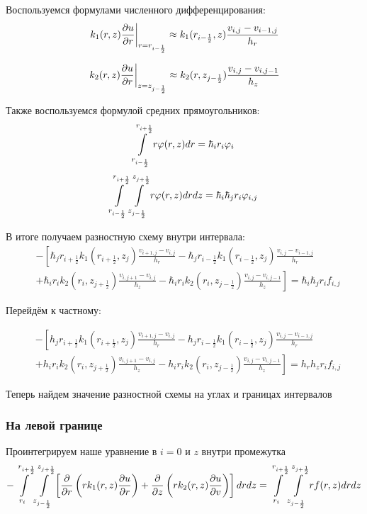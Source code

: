 Воспользуемся формулами численного дифференцирования:
\[
  \left . k_1(r, z) \pdv{u}{r} \right \vert_{r = r_{i - \frac{1}{2}}}
  \approx k_1(r_{i - \frac{1}{2}}, z) 
  \frac{v_{i, j} - v_{i - 1, j}}{h_r}
\]

\[
  \left . k_2(r, z) \pdv{u}{r} \right \vert_{z = z_{j - \frac{1}{2}}}
  \approx k_2(r, z_{j - \frac{1}{2}}) 
  \frac{v_{i, j} - v_{i, j - 1}}{h_z}
\]

Также воспользуемся формулой средних прямоугольников:
\[
  \int\limits^{r_{i+\frac{1}{2}}}_{r_{i-\frac{1}{2}}} r \varphi(r, z) dr
  = \hbar_i r_i \varphi_i
\]
\[
  \int\limits^{r_{i +\frac{1}{2}}}_{r_{i -\frac{1}{2}}} \int\limits^{z_{j +\frac{1}{2}}}_{z_{j -\frac{1}{2}}} r \varphi(r, z) drdz
  = \hbar_i\hbar_j r_i \varphi_{i, j}
\]

В итоге получаем разностную схему внутри интервала:
\begin{align*}
  &- \left [ 
  \hbar_j r_{i+\frac{1}{2}} k_1(r_{i+\frac{1}{2}}, z_j) \frac{v_{i+1, j} - v_{i, j}}{h_{r}}
  - \hbar_j r_{i-\frac{1}{2}} k_1(r_{i-\frac{1}{2}}, z_j) \frac{v_{i, j} - v_{i - 1, j}}{h_{r}}
  \right . \\
  &\left .
  + \hbar_i r_{i} k_2(r_i, z_{j+\frac{1}{2}}) \frac{v_{i, j + 1} - v_{i, j}}{h_{z}}
  - \hbar_i r_{i} k_2(r_i, z_{j-\frac{1}{2}}) \frac{v_{i, j} - v_{i, j - 1}}{h_z}
  \right ]  = \hbar_i \hbar_j r_i f_{i, j}
\end{align*}

Перейдём к частному:

\begin{align*}
  &- \left [ 
  h_j r_{i+\frac{1}{2}} k_1(r_{i+\frac{1}{2}}, z_j) \frac{v_{i+1, j} - v_{i, j}}{h_{r}}
  - h_j r_{i-\frac{1}{2}} k_1(r_{i-\frac{1}{2}}, z_j) \frac{v_{i, j} - v_{i - 1, j}}{h_{r}}
  \right . \\
  &\left .
  + h_i r_{i} k_2(r_i, z_{j+\frac{1}{2}}) \frac{v_{i, j + 1} - v_{i, j}}{h_{z}}
  - h_i r_{i} k_2(r_i, z_{j-\frac{1}{2}}) \frac{v_{i, j} - v_{i, j - 1}}{h_z}
  \right ]  = h_r h_z r_i f_{i, j}
\end{align*}

Теперь найдем значение разностной схемы на углах и границах интервалов

\subsubsection{На левой границе}

Проинтегрируем наше уравнение в $ i = 0 $ и $ z $ внутри промежутка
\[
  - \int\limits^{r_{i +\frac{1}{2}}}_{r_{i }} \int\limits^{z_{j +\frac{1}{2}}}_{z_{j -\frac{1}{2}}} \left [ \pdv{}{r} \left ( r k_1(r, z) \pdv{u}{r} \right ) 
  + \pdv{}{z} \left ( rk_2(r, z)\pdv{u}{v} \right ) \right ] dr dz = \int\limits^{r_{i +\frac{1}{2}}}_{r_{i }} \int\limits^{z_{j +\frac{1}{2}}}_{z_{j -\frac{1}{2}}} rf(r, z) dr dz
\]

